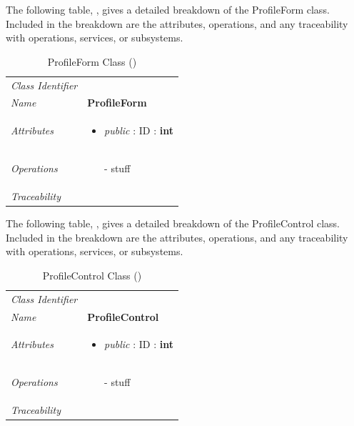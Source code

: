\documentclass[12pt,letterpaper]{article}
\begin{document}
The following table, , gives a detailed breakdown of the ProfileForm class. Included in the breakdown are the attributes, operations, and any traceability with operations, services, or subsystems.

\begin{table}[H]
    \caption{ProfileForm Class ()} 
	\begin{tabu} to 
		\toprule
		Class Identifier &  \\
		Name & {\bf ProfileForm} \\
		Attributes & 
		\begin{minipage}[t]{\linewidth}
		    \begin{itemize}
		        \item \textit{public} : ID : \bf{int}
			\end{itemize}
	    \end{minipage} \\

		Operations &
		\begin{minipage}[t]{\linewidth}
			\begin{enumerate}
			    \item[-] stuff
	        \end{enumerate}
	    \end{minipage} \\
	    	Traceability & \\
		\toprule
	\end{tabu}
\end{table}

The following table, , gives a detailed breakdown of the ProfileControl class. Included in the breakdown are the attributes, operations, and any traceability with operations, services, or subsystems.

\begin{table}[H]
    \caption{ProfileControl Class ()} 
	\begin{tabu} to 
		\toprule
		Class Identifier &  \\
		Name & {\bf ProfileControl} \\
		Attributes & 
		\begin{minipage}[t]{\linewidth}
		    \begin{itemize}
		        \item \textit{public} : ID : \bf{int}
			\end{itemize}
	    \end{minipage} \\

		Operations &
		\begin{minipage}[t]{\linewidth}
			\begin{enumerate}
			    \item[-] stuff
	        \end{enumerate}
	    \end{minipage} \\
	    	Traceability & \\
		\toprule
	\end{tabu}
\end{table}
\end{document}

